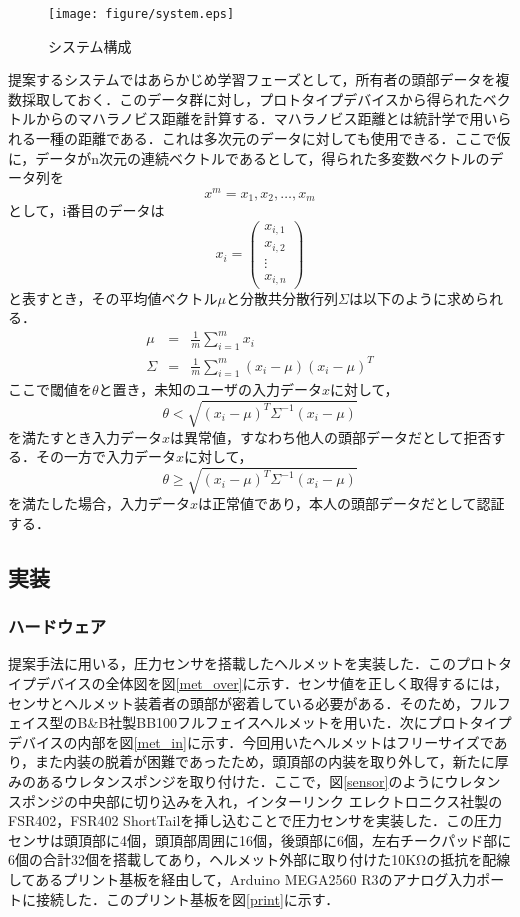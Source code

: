 \documentclass[Japanese]{dicomopapers}
\begin{document}
\begin{figure}[!t]
  \begin{center}
    \texttt{[image: figure/system.eps]}
  \end{center}
    \vspace{-8mm}
  \caption{システム構成}
  \label{system}
\end{figure}

提案するシステムではあらかじめ学習フェーズとして，所有者の頭部データを複数採取しておく．このデータ群に対し，プロトタイプデバイスから得られたベクトルからのマハラノビス距離を計算する．マハラノビス距離とは統計学で用いられる一種の距離である．これは多次元のデータに対しても使用できる．ここで仮に，データがn次元の連続ベクトルであるとして，得られた多変数ベクトルのデータ列を
\[
  x^m = x_1, x_2, \ldots, x_m
\]
として，i番目のデータは
\[
  x_i = \left(
        \begin{array}{c}
            x_{i,1} \\
            x_{i,2} \\
            \vdots \\
            x_{i,n}
        \end{array}
    \right)
\]
と表すとき，その平均値ベクトル$\mu$と分散共分散行列$\Sigma$は以下のように求められる．
\begin{eqnarray*}
  \mu &=& \frac{1}{m}\sum_{i=1}^{m}x_i \\
  \Sigma &=& \frac{1}{m}\sum_{i=1}^{m}(x_i-\mu)(x_i-\mu)^T
\end{eqnarray*}
ここで閾値を$\theta$と置き，未知のユーザの入力データ$x$に対して，
\[
  \theta < \sqrt{(x_i-\mu)^{T}\Sigma^{-1}(x_i-\mu)}
\]
を満たすとき入力データ$x$は異常値，すなわち他人の頭部データだとして拒否する．その一方で入力データ$x$に対して，
\[
  \theta \geq \sqrt{(x_i-\mu)^{T}\Sigma^{-1}(x_i-\mu)}
\]
を満たした場合，入力データ$x$は正常値であり，本人の頭部データだとして認証する．

\subsection{実装}
\subsubsection{ハードウェア}
提案手法に用いる，圧力センサを搭載したヘルメットを実装した．このプロトタイプデバイスの全体図を図\ref{met_over}に示す．センサ値を正しく取得するには，センサとヘルメット装着者の頭部が密着している必要がある．そのため，フルフェイス型のB\&B社製BB100フルフェイスヘルメットを用いた．次にプロトタイプデバイスの内部を図\ref{met_in}に示す．今回用いたヘルメットはフリーサイズであり，また内装の脱着が困難であったため，頭頂部の内装を取り外して，新たに厚みのあるウレタンスポンジを取り付けた．ここで，図\ref{sensor}のようにウレタンスポンジの中央部に切り込みを入れ，インターリンク エレクトロニクス社製のFSR402，FSR402 ShortTailを挿し込むことで圧力センサを実装した．この圧力センサは頭頂部に4個，頭頂部周囲に16個，後頭部に6個，左右チークパッド部に6個の合計32個を搭載してあり，ヘルメット外部に取り付けた10KΩの抵抗を配線してあるプリント基板を経由して，Arduino MEGA2560 R3のアナログ入力ポートに接続した．このプリント基板を図\ref{print}に示す．
\end{document}
